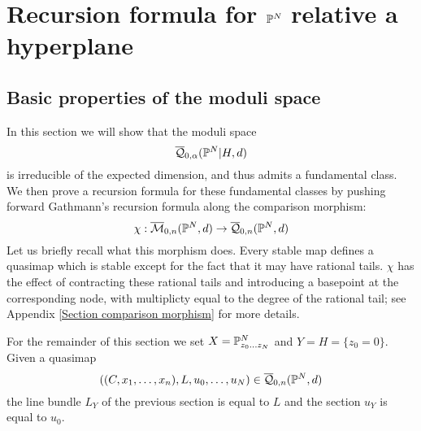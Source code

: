 \section{Recursion formula for $\mathbb P^N$ relative a hyperplane} \label{Section recursion for PN}

\subsection{Basic properties of the moduli space} \label{Subsection basic properties of the moduli space}
In this section we will show that the moduli space
\begin{equation*} \overline{\mathcal Q}_{0,\alpha}(\mathbb P^N|H,d) \end{equation*}
is irreducible of the expected dimension, and thus admits a fundamental class. We then prove a recursion formula for these fundamental classes by pushing forward Gathmann's recursion formula along the comparison morphism:
\begin{equation*}\chi : \overline{\mathcal M}_{0,n}(\mathbb P^N,d) \rightarrow \overline{\mathcal Q}_{0,n}(\mathbb P^N,d) \end{equation*}
Let us briefly recall what this morphism does. Every stable map defines a quasimap which is stable except for the fact that it may have rational tails. $\chi$ has the effect of contracting these rational tails and introducing a basepoint at the corresponding node, with multiplicty equal to the degree of the rational tail; see Appendix \ref{Section comparison morphism} for more details.

For the remainder of this section we set $X=\mathbb P^N_{z_0 \ldots z_N}$ and $Y=H=\{ z_0 = 0 \}$. Given a quasimap
\begin{equation*} ((C,x_1,\ldots,x_n), L, u_0,\ldots,u_N) \in \overline{\mathcal Q}_{0,n}(\mathbb P^N,d) \end{equation*}
the line bundle $L_Y$ of the previous section is equal to $L$ and the section $u_Y$ is equal to $u_0$.

